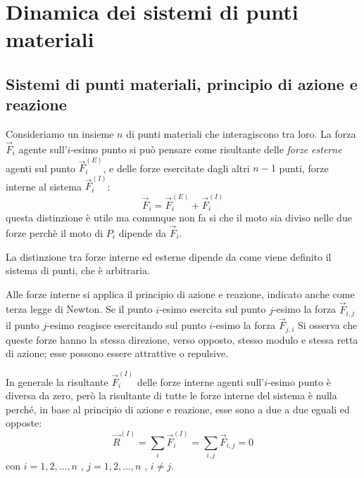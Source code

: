 \documentclass[class=book, crop=false, oneside, 12pt]{standalone}
\begin{document}
\chapter{Dinamica dei sistemi di punti materiali}

\section{Sistemi di punti materiali, principio di azione e reazione}

Consideriamo un insieme \(n\) di punti materiali che interagiscono tra loro.\newline
La forza \(\overrightarrow{F}_i\) agente sull'\(i\)-esimo punto si può pensare come risultante delle \emph{forze esterne}
agenti sul punto \(\overrightarrow{F}_i^{(E)}\), e delle forze esercitate dagli altri \(n-1\) punti, forze interne al sistema \(\overrightarrow{F}_i^{(I)}\):
\begin{equation}
    \overrightarrow{F}_i = \overrightarrow{F}_i^{(E)} + \overrightarrow{F}_i^{(I)}
\end{equation}
questa distinzione è utile ma comunque non fa si che il moto sia diviso nelle due forze perchè il moto di \(P_i\) dipende da \(\overrightarrow{F}_i\).

La distinzione tra forze interne ed esterne dipende da come viene definito il sistema di punti, che è arbitraria.

Alle forze interne si applica il principio di azione e reazione, indicato anche come terza legge di Newton. 
Se il punto \(i\)-esimo esercita sul punto \(j\)-esimo la forza \(\overrightarrow{F}_{i,j}\) il punto \(j\)-esimo reagisce esercitando sul punto \(i\)-esimo la forza \(\overrightarrow{F}_{j,i}\)
Si osserva che queste forze hanno la stessa direzione, verso opposto, stesso modulo e stessa retta di azione; esse possono essere attrattive o repulsive. 

In generale la risultante \(\overrightarrow{F}_i^{(I)}\) delle forze interne agenti sull'\(i\)-esimo punto è diversa da zero, però la risultante di tutte le forze interne del sistema è nulla perché, in base al principio di azione e reazione, esse sono a due a due eguali ed opposte:
\begin{equation}
    \overrightarrow{R}^{(I)} = \sum_i \overrightarrow{F}_i^{(I)} = \sum_{i,j} \overrightarrow{F}_{i,j} = 0 
\end{equation}
con \(i  = 1,2,...,n\) , \(j = 1,2,...,n\) , \(i \neq j\).
\end{document}
